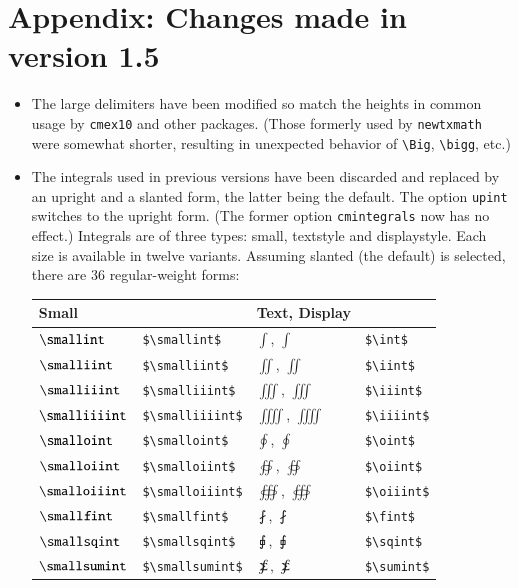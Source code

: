 \documentclass[11pt]{article}
\theoremstyle{oldplain}
\theoremstyle{plain}
\begin{document}
\section{Appendix: Changes made in version 1.5}
\begin{itemize}
\item
The large delimiters have been modified so match the heights in common usage by \texttt{cmex10} and other packages. (Those formerly used by \texttt{newtxmath} were somewhat shorter, resulting in unexpected behavior of \verb|\Big|, \verb|\bigg|, etc.)
\item
The integrals used in previous versions have been discarded and replaced by an upright and a slanted form, the latter being the default. The option {\tt upint} switches to the upright form. (The former option {\tt cmintegrals} now has no effect.) Integrals are of three types: small, textstyle and displaystyle. Each size is available in twelve variants. Assuming slanted (the default) is selected, there are 36 regular-weight forms:
\setlength{\extrarowheight}{8pt}
\begin{center}
  \begin{tabular}{@{} llll @{}}
    \toprule
     Small && Text, Display& \\ 
    \midrule
$\smallint$  & \verb|$\smallint$|& $\int$, $\displaystyle{\int}$& \verb|$\int$|\\ 
$\smalliint$  & \verb|$\smalliint$|& $\iint$, $\displaystyle{\iint}$&\verb|$\iint$|\\ 
$\smalliiint$  & \verb|$\smalliiint$|& $\iiint$, $\displaystyle{\iiint}$& \verb|$\iiint$|\\ 
$\smalliiiint$  & \verb|$\smalliiiint$|& $\iiiint$, $\displaystyle{\iiiint}$& \verb|$\iiiint$|\\ 
$\smalloint$  & \verb|$\smalloint$|& $\oint$, $\displaystyle{\oint}$& \verb|$\oint$|\\ 
$\smalloiint$  & \verb|$\smalloiint$|& $\oiint$, $\displaystyle{\oiint}$& \verb|$\oiint$|\\ 
$\smalloiiint$  & \verb|$\smalloiiint$|& $\oiiint$, $\displaystyle{\oiiint}$& \verb|$\oiiint$|\\ 
$\smallfint$  & \verb|$\smallfint$|& $\fint$, $\displaystyle{\fint}$& \verb|$\fint$|\\ 
$\smallsqint$  & \verb|$\smallsqint$|& $\sqint$, $\displaystyle{\sqint}$& \verb|$\sqint$|\\ 
$\smallsumint$  & \verb|$\smallsumint$|& $\sumint$, $\displaystyle{\sumint}$& \verb|$\sumint$|\\ 

\end{tabular}
\end{center}
\end{itemize}
\end{document}
